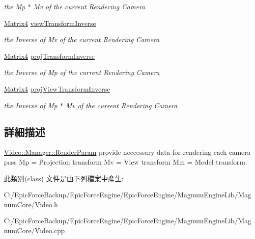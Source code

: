 \begin{DoxyCompactItemize}
\begin{DoxyCompactList}\small\item\em the Mp $\ast$ Mv of the current Rendering Camera \end{DoxyCompactList}\item 
\hyperlink{class_magnum_1_1_matrix4}{Matrix4} \hyperlink{class_magnum_1_1_video_1_1_manager_1_1_render_param_a5f4fd470378d0e5c5dab531022a3ae61}{view\+Transform\+Inverse}\hypertarget{class_magnum_1_1_video_1_1_manager_1_1_render_param_a5f4fd470378d0e5c5dab531022a3ae61}{}\label{class_magnum_1_1_video_1_1_manager_1_1_render_param_a5f4fd470378d0e5c5dab531022a3ae61}

\begin{DoxyCompactList}\small\item\em the Inverse of Mv of the current Rendering Camera \end{DoxyCompactList}\item 
\hyperlink{class_magnum_1_1_matrix4}{Matrix4} \hyperlink{class_magnum_1_1_video_1_1_manager_1_1_render_param_aa969a2d0e1e3a7576d639d6f975c0ab8}{proj\+Transform\+Inverse}\hypertarget{class_magnum_1_1_video_1_1_manager_1_1_render_param_aa969a2d0e1e3a7576d639d6f975c0ab8}{}\label{class_magnum_1_1_video_1_1_manager_1_1_render_param_aa969a2d0e1e3a7576d639d6f975c0ab8}

\begin{DoxyCompactList}\small\item\em the Inverse of Mp of the current Rendering Camera \end{DoxyCompactList}\item 
\hyperlink{class_magnum_1_1_matrix4}{Matrix4} \hyperlink{class_magnum_1_1_video_1_1_manager_1_1_render_param_abcabe40e72a8fc4c5e18f62e38a8a2e0}{proj\+View\+Transform\+Inverse}\hypertarget{class_magnum_1_1_video_1_1_manager_1_1_render_param_abcabe40e72a8fc4c5e18f62e38a8a2e0}{}\label{class_magnum_1_1_video_1_1_manager_1_1_render_param_abcabe40e72a8fc4c5e18f62e38a8a2e0}

\begin{DoxyCompactList}\small\item\em the Inverse of Mp $\ast$ Mv of the current Rendering Camera \end{DoxyCompactList}\end{DoxyCompactItemize}


\subsection{詳細描述}
\hyperlink{class_magnum_1_1_video_1_1_manager_1_1_render_param}{Video\+::\+Manager\+::\+Render\+Param} provide neccessary data for rendering each camera pass Mp = Projection transform Mv = View transform Mm = Model transform. 

此類別(class) 文件是由下列檔案中產生\+:\begin{DoxyCompactItemize}
\item 
C\+:/\+Epic\+Force\+Backup/\+Epic\+Force\+Engine/\+Epic\+Force\+Engine/\+Magnum\+Engine\+Lib/\+Magnum\+Core/Video.\+h\item 
C\+:/\+Epic\+Force\+Backup/\+Epic\+Force\+Engine/\+Epic\+Force\+Engine/\+Magnum\+Engine\+Lib/\+Magnum\+Core/Video.\+cpp\end{DoxyCompactItemize}

